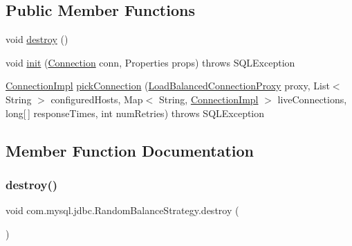 \subsection*{Public Member Functions}
\begin{DoxyCompactItemize}
\item 
void \mbox{\hyperlink{classcom_1_1mysql_1_1jdbc_1_1_random_balance_strategy_a74066c5f309233cd328a1724263d10e4}{destroy}} ()
\item 
void \mbox{\hyperlink{classcom_1_1mysql_1_1jdbc_1_1_random_balance_strategy_a748e276bd760d5671b7d6ee30c9c987f}{init}} (\mbox{\hyperlink{interfacecom_1_1mysql_1_1jdbc_1_1_connection}{Connection}} conn, Properties props)  throws S\+Q\+L\+Exception 
\item 
\mbox{\hyperlink{classcom_1_1mysql_1_1jdbc_1_1_connection_impl}{Connection\+Impl}} \mbox{\hyperlink{classcom_1_1mysql_1_1jdbc_1_1_random_balance_strategy_ab621c7b0143450318d7bb73a3a176651}{pick\+Connection}} (\mbox{\hyperlink{classcom_1_1mysql_1_1jdbc_1_1_load_balanced_connection_proxy}{Load\+Balanced\+Connection\+Proxy}} proxy, List$<$ String $>$ configured\+Hosts, Map$<$ String, \mbox{\hyperlink{classcom_1_1mysql_1_1jdbc_1_1_connection_impl}{Connection\+Impl}} $>$ live\+Connections, long\mbox{[}$\,$\mbox{]} response\+Times, int num\+Retries)  throws S\+Q\+L\+Exception 
\end{DoxyCompactItemize}


\subsection{Member Function Documentation}
\mbox{\label{classcom_1_1mysql_1_1jdbc_1_1_random_balance_strategy_a74066c5f309233cd328a1724263d10e4}} 
\subsubsection{\texorpdfstring{destroy()}{destroy()}}
{\footnotesize\ttfamily void com.\+mysql.\+jdbc.\+Random\+Balance\+Strategy.\+destroy (\begin{DoxyParamCaption}{ }\end{DoxyParamCaption})}

